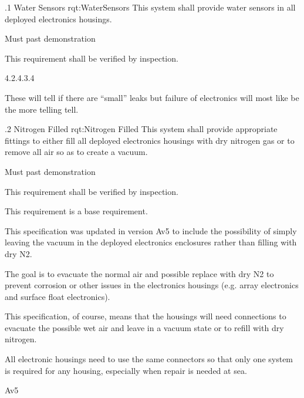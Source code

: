 \ONERQMT
{\RqtNumberBase.1}
{Water Sensors}
{rqt:WaterSensors}
{
This system shall provide water sensors in all deployed electronics housings.
}
{
	\item [Phase 1] Must past demonstration
}
{This requirement shall be verified by inspection.}
{
	\item [\TBD] 4.2.4.3.4
}
{
	\item These will tell if there are ``small'' leaks but failure of electronics will most like be the more telling tell.
}


\ONERQMTV
{\RqtNumberBase.2}
{Nitrogen Filled}
{rqt:Nitrogen Filled}
{
This system shall provide appropriate fittings to either fill all deployed electronics housings with dry nitrogen gas or to remove all air so as to create a vacuum.%
}
{
	\item [Phase 1] Must past demonstration
}
{This requirement shall be verified by inspection.}
{
	\item [N/A] This requirement is a base requirement.
}
{
	\item This specification was updated in version Av5 to include the possibility of simply leaving the vacuum in the deployed electronics enclosures rather than filling with dry N2.
	\item The goal is to evacuate the normal air and possible replace with dry N2 to prevent corrosion or other issues in the electronics housings (e.g. array electronics and surface float electronics).
	\item This specification, of course, means that the housings will need connections to evacuate the possible wet air and leave in a vacuum state or to refill with dry nitrogen.
	\item All electronic housings need to use the same connectors so that only one system is required for any housing, especially when repair is needed at sea.
}
{Av5}



